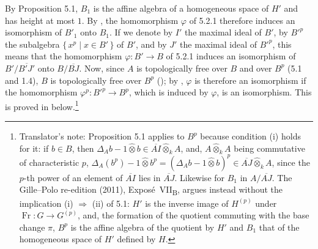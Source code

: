 By Proposition 5.1, \(B_1\) is the affine algebra of a homogeneous
space of \(H'\) and has height at most \(1\). By , the
homomorphism \(\varphi\) of 5.2.1 therefore induces an isomorphism of
\(B'_1\) onto \(B_1\). If we denote by \(I'\) the maximal ideal of
\(B'\), by \(B'^p\) the subalgebra \(\{\,x^p\mid x\in B'\,\}\) of
\(B'\), and by \(J'\) the maximal ideal of \(B'^p\), this means that the
homomorphism \(\varphi:B'\to B\) of 5.2.1 induces an isomorphism of
\(B'/\overline{B'J'}\) onto \(B/\overline{BJ}\). Now, since \(A\) is
topologically free over \(B\) and over \(B^p\) \textup{(5.1 and 1.4)},
\(B\) is topologically free over \(B^p\) \textup{()}; by
, \(\varphi\) is therefore an isomorphism if the homomorphism
\(\varphi^p:B'^p\to B^p\), which is induced by \(\varphi\), is an
isomorphism. This is proved in  below.\footnote{Translator's
note: Proposition 5.1 applies to \(B^p\) because condition \textup{(i)} holds for it: if \(b\in B\), then
\(\Delta_Ab-1\widehat\otimes b\in\overline{AI}\widehat\otimes_kA\), and, \(A\widehat\otimes_kA\) being
commutative of characteristic \(p\),
\(\Delta_A(b^p)-1\widehat\otimes b^p=(\Delta_Ab-1\widehat\otimes b)^p\in\overline{AJ}\widehat\otimes_kA\),
since the \(p\)-th power of an element of \(\overline{AI}\) lies in \(\overline{AJ}\). Likewise for \(B_1\) in
\(A/\overline{AJ}\). The Gille--Polo re-edition (2011), Expos\'e~VII\textsubscript{B}, argues instead without
the implication \textup{(i)} \(\Rightarrow\) \textup{(ii)} of 5.1: \(H'\) is the inverse image of \(H^{(p)}\)
under \(\operatorname{Fr}:G\to G^{(p)}\), and, the formation of the quotient commuting with the base change
\(\pi\), \(B^p\) is the affine algebra of the quotient by \(H'\) and \(B_1\) that of the homogeneous space
of \(H'\) defined by \(H\).}
